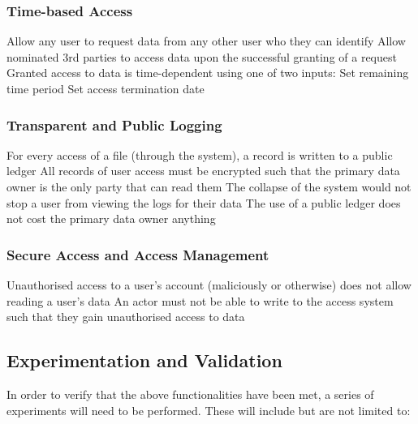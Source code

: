 \subsubsection{Time-based Access}

\begin{outline}
  \1 Allow any user to request data from any other user who they can identify
  \1 Allow nominated 3rd parties to access data upon the successful granting of a request
  \1 Granted access to data is time-dependent using one of two inputs:
    \2 Set remaining time period
    \2 Set access termination date
\end{outline}

\subsubsection{Transparent and Public Logging}

\begin{outline}
  \1 For every access of a file (through the system), a record is written to a public ledger
  \1 All records of user access must be encrypted such that the primary data owner is the only party that can read them
  \1 The collapse of the system would not stop a user from viewing the logs for their data
  \1 The use of a public ledger does not cost the primary data owner anything
\end{outline}

\subsubsection{Secure Access and Access Management}

\begin{outline}
  \1 Unauthorised access to a user's account (maliciously or otherwise) does not allow reading a user's data
  \1 An actor must not be able to write to the access system such that they gain unauthorised access to data
\end{outline}

\subsection{Experimentation and Validation}

In order to verify that the above functionalities have been met, a series of experiments will need to be performed. These will include but are not limited to:


